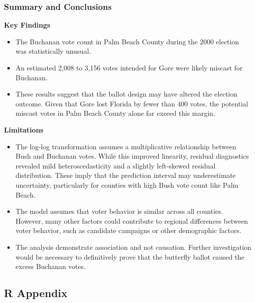 \documentclass[
  letterpaper,
  DIV=11,
  numbers=noendperiod]{scrartcl}
\begin{document}
\hypertarget{summary-and-conclusions}{%
\subsubsection{Summary and Conclusions}\label{summary-and-conclusions}}

\textbf{Key Findings}

\begin{itemize}
\item
  The Buchanan vote count in Palm Beach County during the 2000 election
  was statistically unusual.
\item
  An estimated 2,008 to 3,156 votes intended for Gore were likely
  miscast for Buchanan.
\item
  These results suggest that the ballot design may have altered the
  election outcome. Given that Gore lost Florida by fewer than 400
  votes, the potential miscast votes in Palm Beach County alone far
  exceed this margin.
\end{itemize}

\textbf{Limitations}

\begin{itemize}
\item
  The log-log transformation assumes a multiplicative relationship
  between Bush and Buchanan votes. While this improved linearity,
  residual diagnostics revealed mild heteroscedasticity and a slightly
  left-skewed residual distribution. These imply that the prediction
  interval may underestimate uncertainty, particularly for counties with
  high Bush vote count like Palm Beach.
\item
  The model assumes that voter behavior is similar across all counties.
  However, many other factors could contribute to regional differences
  between voter behavior, such as candidate campaigns or other
  demographic factors.
\item
  The analysis demonstrate association and not causation. Further
  investigation would be necessary to definitively prove that the
  butterfly ballot caused the excess Buchanan votes.
\end{itemize}

\hypertarget{r-appendix}{%
\subsection{R Appendix}\label{r-appendix}}
\end{document}
